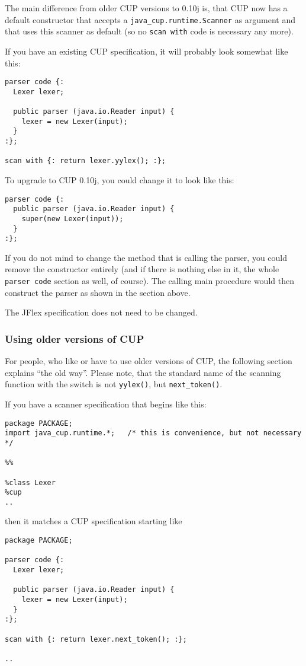 \documentclass[11pt]{scrartcl}
\newcommand{\xsmall}{}
\begin{document}
The main difference from older CUP versions to 0.10j is, that CUP now
has a default constructor that accepts a \texttt{java\_cup.runtime.Scanner} 
as argument and that uses this scanner as
default (so no \texttt{scan with} code is necessary any more).

If you have an existing CUP specification, it will probably look somewhat like this:
{\xsmall\begin{verbatim}
parser code {:
  Lexer lexer;

  public parser (java.io.Reader input) {
    lexer = new Lexer(input);
  }
:};

scan with {: return lexer.yylex(); :};
\end{verbatim}
}

To upgrade to CUP 0.10j, you could change it to look like this:
{\xsmall\begin{verbatim}
parser code {:
  public parser (java.io.Reader input) {
    super(new Lexer(input));
  }
:};
\end{verbatim}
}

If you do not mind to change the method that is calling the parser,
you could remove the constructor entirely (and if there is nothing else
in it, the whole \texttt{parser code} section as well, of course). The calling
main procedure would then construct the parser as shown in the section above.

The JFlex specification does not need to be changed.

\subsubsection{Using older versions of CUP}
For people, who like or have to use older versions of CUP, the following section 
explains ``the old way''. Please note, that the standard name of the scanning 
function with the \texttt{} switch is not 
\texttt{yylex()}, but \texttt{next\_token()}.

If you have a scanner specification that begins like this:

{\xsmall\begin{verbatim}
package PACKAGE;
import java_cup.runtime.*;   /* this is convenience, but not necessary */
 
%%
 
%class Lexer
%cup
..
\end{verbatim}
}

then it matches a CUP specification starting  like

{\xsmall\begin{verbatim}
package PACKAGE;

parser code {:
  Lexer lexer;

  public parser (java.io.Reader input) {
    lexer = new Lexer(input);
  }
:};

scan with {: return lexer.next_token(); :};

..
\end{verbatim}
}
\end{document}
